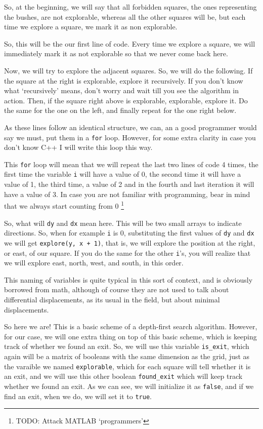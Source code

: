 \documentclass[12pt]{article}
\begin{document}
So, at the beginning, we will say that all forbidden squares,
the ones representing the bushes, are not explorable,
whereas all the other squares will be, but each time
we explore a square, we mark it as non explorable.

So, this will be the our first line of code. Every time
we explore a square, we will immediately mark it as not explorable
so that we never come back here.

Now, we will try to explore the adjacent squares.
So, we will do the following. If the square at the right is
explorable, explore it recursively. If you don't know what 
`recursively' means, don't worry and wait till you see the
algorithm in action. Then, if the square right above
is explorable, explorable, explore it. Do the same for the
one on the left, and finally repeat for the one right below.

As these lines follow an identical structure, we can,
an a good programmer would say we must,
put them in a \verb|for| loop. However, for some extra clarity
in case you don't know C++ I will write this loop this way.

This \verb|for| loop will mean that we will repeat the last two
lines
of code 4 times, the first time the variable \verb|i| will have
a value of 0, the second time it will have a value of 1,
the third time, a value of 2 and in the 
fourth and last iteration it will have a value of 3.
In case you are not familiar with programming, bear in mind
that we always start counting from 0 \footnote{TODO: Attack
MATLAB `programmers'}

So, what will \verb|dy| and \verb|dx| mean here.
This will be two small arrays to indicate directions.
So, when for example \verb|i| is 0, substituting
the first values of \verb|dy| and \verb|dx| we will get
\verb|explore(y, x + 1)|, that is, we will explore
the position at the right, or east, of our square.
If you do the same for the other \verb|i|'s, you will realize
that we will explore east, north, west, and south, in this order.

This naming of variables is quite typical
in this sort of context, and is obviously borrowed from math,
although of course they are not used to talk about differential
displacements, as its usual in the field,
but about minimal displacements.

So here we are! This is a basic scheme of a depth-first
search algorithm. However, for our case, we will one extra thing
on top of this basic scheme, which is keeping track of whether
we found an exit. So, we will
use this variable \verb|is_exit|, which again will be a matrix
of booleans with the same dimension as the grid, just as the
varaible we named \verb|explorable|, which for each square
will tell whether it is an exit, and we will use this other
boolean \verb|found_exit| which will keep track whether we found
an exit. As we can see, we will initialize it as \verb|false|,
and if we find an exit, when we do, we will set it to
\verb|true|.
\end{document}

